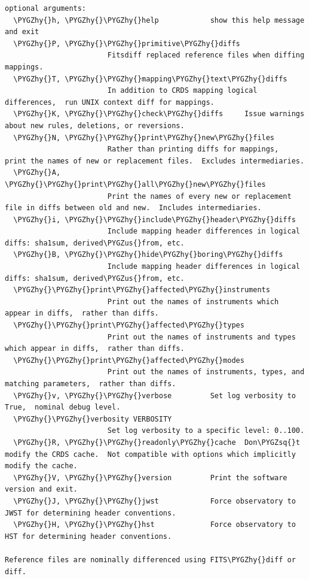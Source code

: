 \documentclass[letterpaper,10pt,english]{sphinxmanual}
\def\PYGZus{\char`\_}
\def\PYGZhy{\char`\-}
\def\PYGZsq{\char`\'}
\renewcommand\PYGZsq{\textquotesingle}
\begin{document}
\begin{Verbatim}[commandchars=\\\{\}]
optional arguments:
  \PYGZhy{}h, \PYGZhy{}\PYGZhy{}help            show this help message and exit
  \PYGZhy{}P, \PYGZhy{}\PYGZhy{}primitive\PYGZhy{}diffs
                        Fitsdiff replaced reference files when diffing mappings.
  \PYGZhy{}T, \PYGZhy{}\PYGZhy{}mapping\PYGZhy{}text\PYGZhy{}diffs
                        In addition to CRDS mapping logical differences,  run UNIX context diff for mappings.
  \PYGZhy{}K, \PYGZhy{}\PYGZhy{}check\PYGZhy{}diffs     Issue warnings about new rules, deletions, or reversions.
  \PYGZhy{}N, \PYGZhy{}\PYGZhy{}print\PYGZhy{}new\PYGZhy{}files
                        Rather than printing diffs for mappings,  print the names of new or replacement files.  Excludes intermediaries.
  \PYGZhy{}A, \PYGZhy{}\PYGZhy{}print\PYGZhy{}all\PYGZhy{}new\PYGZhy{}files
                        Print the names of every new or replacement file in diffs between old and new.  Includes intermediaries.
  \PYGZhy{}i, \PYGZhy{}\PYGZhy{}include\PYGZhy{}header\PYGZhy{}diffs
                        Include mapping header differences in logical diffs: sha1sum, derived\PYGZus{}from, etc.
  \PYGZhy{}B, \PYGZhy{}\PYGZhy{}hide\PYGZhy{}boring\PYGZhy{}diffs
                        Include mapping header differences in logical diffs: sha1sum, derived\PYGZus{}from, etc.
  \PYGZhy{}\PYGZhy{}print\PYGZhy{}affected\PYGZhy{}instruments
                        Print out the names of instruments which appear in diffs,  rather than diffs.
  \PYGZhy{}\PYGZhy{}print\PYGZhy{}affected\PYGZhy{}types
                        Print out the names of instruments and types which appear in diffs,  rather than diffs.
  \PYGZhy{}\PYGZhy{}print\PYGZhy{}affected\PYGZhy{}modes
                        Print out the names of instruments, types, and matching parameters,  rather than diffs.
  \PYGZhy{}v, \PYGZhy{}\PYGZhy{}verbose         Set log verbosity to True,  nominal debug level.
  \PYGZhy{}\PYGZhy{}verbosity VERBOSITY
                        Set log verbosity to a specific level: 0..100.
  \PYGZhy{}R, \PYGZhy{}\PYGZhy{}readonly\PYGZhy{}cache  Don\PYGZsq{}t modify the CRDS cache.  Not compatible with options which implicitly modify the cache.
  \PYGZhy{}V, \PYGZhy{}\PYGZhy{}version         Print the software version and exit.
  \PYGZhy{}J, \PYGZhy{}\PYGZhy{}jwst            Force observatory to JWST for determining header conventions.
  \PYGZhy{}H, \PYGZhy{}\PYGZhy{}hst             Force observatory to HST for determining header conventions.

Reference files are nominally differenced using FITS\PYGZhy{}diff or diff.


\end{Verbatim}
\end{document}
